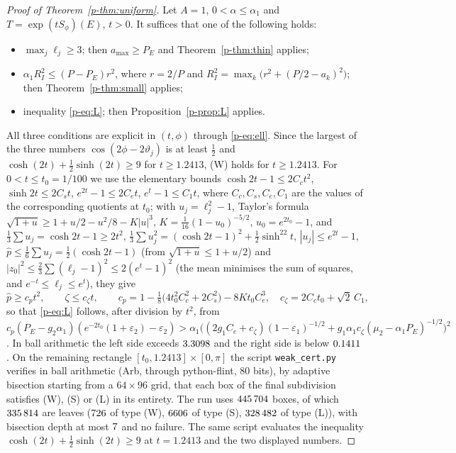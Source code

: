 \documentclass[11pt]{article}
\theoremstyle{remark}
\begin{document}
\begin{proof}[Proof of Theorem~\ref{p-thm:uniform}]
Let $A=1$, $0<\alpha\le\alpha_1$ and $T=\exp(tS_\phi)(E)$, $t>0$. It suffices that one of the
following holds:
\begin{itemize}
\item[(W)] $\max_j\ell_j\ge3$; then $a_{\max}\ge P_E$ and Theorem~\ref{p-thm:thin} applies;
\item[(S)] $\alpha_1R_I^2\le(P-P_E)r^2$, where $r=2/P$ and
$R_I^2=\max_k\bigl(r^2+(P/2-a_k)^2\bigr)$; then Theorem~\ref{p-thm:small} applies;
\item[(L)] inequality \eqref{p-eq:L}; then Proposition~\ref{p-prop:L} applies.
\end{itemize}
All three conditions are explicit in $(t,\phi)$ through \eqref{p-eq:ell}. Since the largest of the
three numbers $\cos(2\phi-2\vartheta_j)$ is at least $\frac12$ and
$\cosh(2t)+\frac12\sinh(2t)\ge9$ for $t\ge1.2413$, (W) holds for $t\ge1.2413$. For $0<t\le t_0=1/100$
we use the elementary bounds $\cosh2t-1\le2C_ct^2$, $\sinh2t\le2C_st$, $e^{2t}-1\le2C_et$,
$e^t-1\le C_1t$, where $C_c,C_s,C_e,C_1$ are the values of the corresponding quotients at $t_0$;
with $u_j=\ell_j^2-1$, Taylor's formula $\sqrt{1+u}\ge1+u/2-u^2/8-K|u|^3$,
$K=\frac1{16}(1-u_0)^{-5/2}$, $u_0=e^{2t_0}-1$, and $\frac13\sum u_j=\cosh2t-1\ge2t^2$,
$\frac13\sum u_j^2=(\cosh2t-1)^2+\frac12\sinh^22t$, $|u_j|\le e^{2t}-1$,
$\hat p\le\frac16\sum u_j=\frac12(\cosh2t-1)$ (from $\sqrt{1+u}\le1+u/2$) and
$|z_0|^2\le\frac23\sum(\ell_j-1)^2\le2(e^t-1)^2$ (the mean minimises the sum of squares, and
$e^{-t}\le\ell_j\le e^t$), they give
\[
  \hat p\ge c_pt^2,\qquad \zeta\le c_\zeta t,\qquad
  c_p=1-\tfrac18\bigl(4t_0^2C_c^2+2C_s^2\bigr)-8Kt_0C_e^3,\quad
  c_\zeta=2C_ct_0+\sqrt2\,C_1 ,
\]
so that \eqref{p-eq:L} follows, after division by $t^2$, from
$c_p(P_E-g_2\alpha_1)(e^{-2t_0}(1+\varepsilon_2)-\varepsilon_2)>
\alpha_1\bigl((2g_1C_e+c_\zeta)(1-\varepsilon_1)^{-1/2}
+g_1\alpha_1c_\zeta(\mu_2-\alpha_1P_E)^{-1/2}\bigr)^2$. In ball arithmetic the left side exceeds $3.3098$ and the right side is below $0.1411$.
On the remaining rectangle $[t_0,1.2413]\times[0,\pi]$ the script \texttt{weak\_cert.py} verifies
in ball arithmetic (Arb, through python-flint, $80$ bits), by adaptive bisection starting from a
$64\times96$ grid, that each box of the final subdivision satisfies (W), (S) or (L) in its
entirety. The run uses $445\,704$ boxes, of which $335\,814$ are leaves ($726$ of type
(W), $6606$ of type (S), $328\,482$ of type (L)), with bisection depth at most $7$ and
no failure. The same script evaluates the inequality $\cosh(2t)+\frac12\sinh(2t)\ge9$ at $t=1.2413$ and
the two displayed numbers.
\end{proof}
\end{document}
